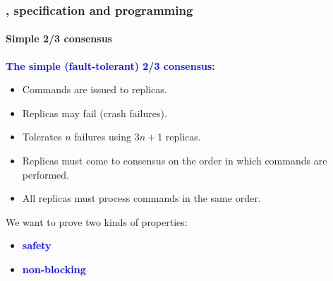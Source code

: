 \documentclass[12pt,red]{beamer}
\newcommand{\cemph}[1]{\textcolor{blue}{\textbf{#1}}}
\begin{document}
\begin{frame}[fragile]
  \frametitle{\eml, specification and programming}

  \framesubtitle{Simple 2/3 consensus}

  \cemph{The simple (fault-tolerant) 2/3 consensus:}
  \begin{itemize}
  \item Commands are issued to replicas.

  \item Replicas may fail (crash failures).

  \item Tolerates $n$ failures using $3n+1$ replicas.

  \item Replicas must come to consensus on the order in which commands
    are performed.

  \item All replicas must process commands in the same order.
  \end{itemize}

  \vspace{0.2in}

  We want to prove two kinds of properties:
  \begin{itemize}
  \item \cemph{safety}
  \item \cemph{non-blocking}
  \end{itemize}
\end{frame}
\end{document}
